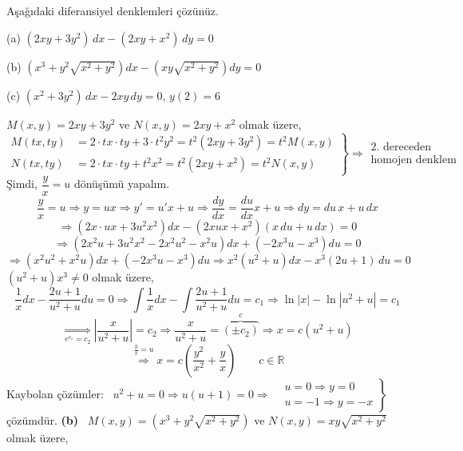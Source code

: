 \documentclass[11pt,a4paper]{article}
\begin{document}
\begin{ornek}[8]
Aşağıdaki diferansiyel denklemleri çözünüz.

(a) $(2xy + 3y^2)\,dx - (2xy + x^2)\,dy = 0$

(b) $\left(x^3 + y^2\sqrt{x^2+y^2}\right)dx - \left(xy\sqrt{x^2+y^2}\right)dy = 0$

(c) $(x^2 + 3y^2)\,dx - 2xy\,dy = 0$, \quad $y(2) = 6$
\end{ornek}
\begin{cozum}
$M(x,y) = 2xy + 3y^2$ ve $N(x,y) = 2xy + x^2$ olmak üzere,
\[
\left.\begin{aligned}
M(tx,ty) &= 2\cdot tx\cdot ty + 3\cdot t^2y^2 = t^2\left(2xy + 3y^2\right) = t^2M(x,y)\\
N(tx,ty) &= 2\cdot tx\cdot ty + t^2x^2 = t^2\left(2xy + x^2\right) = t^2N(x,y)
\end{aligned}\right\} \Rightarrow \begin{array}{l}\text{2. dereceden}\\ \text{homojen denklem}\end{array}
\]
Şimdi, $\dfrac{y}{x} = u$ dönüşümü yapalım.
\[
\frac{y}{x} = u \Rightarrow y = ux \Rightarrow y' = u'x + u \Rightarrow \frac{dy}{dx} = \frac{du}{dx}x + u \Rightarrow dy = du\,x + u\,dx
\]
\[
\Rightarrow \left(2x\cdot ux + 3u^2x^2\right)dx - \left(2xux + x^2\right)\left(x\,du + u\,dx\right) = 0
\]
\[
\Rightarrow \left(2x^2u + 3u^2x^2 - 2x^2u^2 - x^2u\right)dx + \left(-2x^3u - x^3\right)du = 0
\]
\[
\Rightarrow \left(x^2u^2 + x^2u\right)dx + \left(-2x^3u - x^3\right)du \Rightarrow x^2\left(u^2+u\right)dx - x^3(2u+1)\,du = 0
\]
$(u^2+u)x^3 \neq 0$ olmak üzere,
\[
\frac1x dx - \frac{2u+1}{u^2+u}du = 0 \Rightarrow \int\frac1x dx - \int\frac{2u+1}{u^2+u}du = c_1 \Rightarrow \ln|x| - \ln|u^2+u| = c_1
\]
\[
\underset{e^{c_1}=c_2}{\Rightarrow} \left|\frac{x}{u^2+u}\right| = c_2 \Rightarrow \frac{x}{u^2+u} = \overbrace{(\pm c_2)}^{c} \Rightarrow x = c\left(u^2+u\right)
\]
\[
\underset{}{\overset{\frac{y}{x}=u}{\Rightarrow}} x = c\left(\frac{y^2}{x^2} + \frac{y}{x}\right) \qquad c \in \mathbb{R}
\]
Kaybolan çözümler: \ $u^2 + u = 0 \Rightarrow u(u+1) = 0 \Rightarrow
\left.\begin{aligned}&u = 0 \Rightarrow y = 0\\ &u = -1 \Rightarrow y = -x\end{aligned}\right\}$ çözümdür.
\textbf{(b)} \ $M(x,y) = \left(x^3 + y^2\sqrt{x^2+y^2}\right)$ ve $N(x,y) = xy\sqrt{x^2+y^2}$ olmak üzere,
\[
\left.\begin{aligned}

\end{aligned}\]
\end{cozum}
\end{document}

